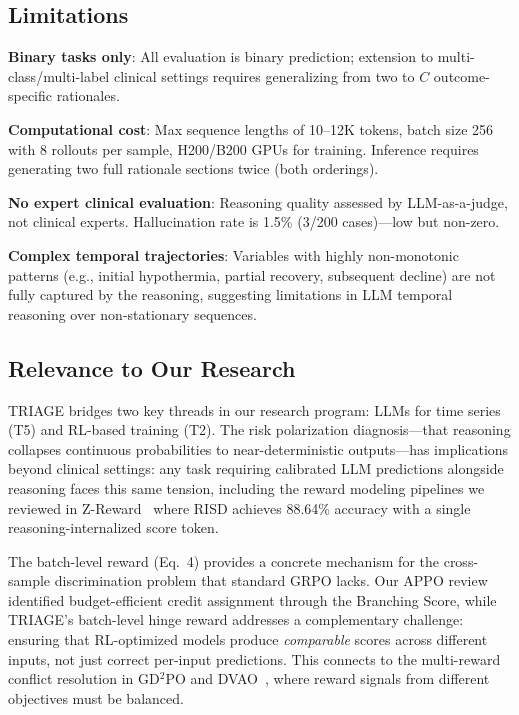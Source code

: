 \documentclass[11pt,a4paper]{article}
\begin{document}
\subsection{Limitations}

\textbf{Binary tasks only}: All evaluation is binary prediction; extension to multi-class/multi-label clinical settings requires generalizing from two to $C$ outcome-specific rationales.

\textbf{Computational cost}: Max sequence lengths of 10--12K tokens, batch size 256 with 8 rollouts per sample, H200/B200 GPUs for training. Inference requires generating two full rationale sections twice (both orderings).

\textbf{No expert clinical evaluation}: Reasoning quality assessed by LLM-as-a-judge, not clinical experts. Hallucination rate is 1.5\% (3/200 cases)---low but non-zero.

\textbf{Complex temporal trajectories}: Variables with highly non-monotonic patterns (e.g., initial hypothermia, partial recovery, subsequent decline) are not fully captured by the reasoning, suggesting limitations in LLM temporal reasoning over non-stationary sequences.

\subsection{Relevance to Our Research}

TRIAGE bridges two key threads in our research program: LLMs for time series (T5) and RL-based training (T2). The risk polarization diagnosis---that reasoning collapses continuous probabilities to near-deterministic outputs---has implications beyond clinical settings: any task requiring calibrated LLM predictions alongside reasoning faces this same tension, including the reward modeling pipelines we reviewed in Z-Reward~\cite{chu2026zreward} where RISD achieves 88.64\% accuracy with a single reasoning-internalized score token.

The batch-level reward (Eq.~4) provides a concrete mechanism for the cross-sample discrimination problem that standard GRPO lacks. Our APPO review~\cite{wang2026appo} identified budget-efficient credit assignment through the Branching Score, while TRIAGE's batch-level hinge reward addresses a complementary challenge: ensuring that RL-optimized models produce \emph{comparable} scores across different inputs, not just correct per-input predictions. This connects to the multi-reward conflict resolution in GD$^2$PO and DVAO~\cite{chen2026dvao}, where reward signals from different objectives must be balanced.
\end{document}
